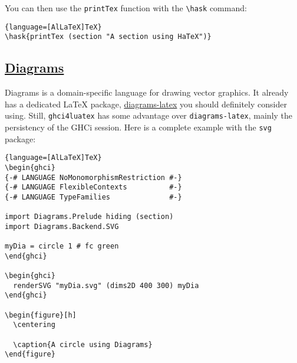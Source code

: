 \documentclass{article}
\begin{document}
You can then use the \texttt{printTex} function with the \texttt{\textbackslash hask} command:

\begin{lstlisting}{language=[AlLaTeX]TeX}
\hask{printTex (section "A section using HaTeX")}
\end{lstlisting}

\subsection{\href{https://diagrams.github.io/}{Diagrams}}

Diagrams is a domain-specific language for drawing vector graphics. It already has a dedicated LaTeX package, \href{https://archives.haskell.org/projects.haskell.org/diagrams/doc/latex.html}{diagrams-latex} you should definitely consider using. Still, \texttt{ghci4luatex} has some advantage over \texttt{diagrams-latex}, mainly the persistency of the GHCi session. Here is a complete example with the \texttt{svg} package:

\begin{latexbox}
  \begin{lstlisting}{language=[AlLaTeX]TeX}
\begin{ghci}
{-# LANGUAGE NoMonomorphismRestriction #-}
{-# LANGUAGE FlexibleContexts          #-}
{-# LANGUAGE TypeFamilies              #-}

import Diagrams.Prelude hiding (section)
import Diagrams.Backend.SVG

myDia = circle 1 # fc green
\end{ghci}

\begin{ghci}
  renderSVG "myDia.svg" (dims2D 400 300) myDia
\end{ghci}

\begin{figure}[h]
  \centering
  
  \caption{A circle using Diagrams}
\end{figure}

\end{lstlisting}
\end{latexbox}
\end{document}
